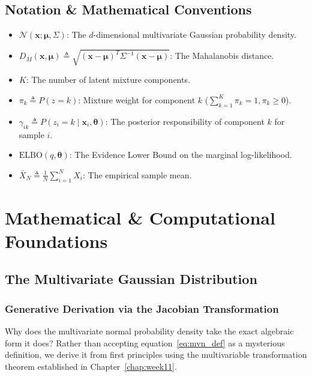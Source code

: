 \subsection{Notation \& Mathematical Conventions}
\begin{itemize}
    \item $\mathcal{N}(\mathbf{x}; \boldsymbol{\mu}, \Sigma)$: The $d$-dimensional multivariate Gaussian probability density.
    \item $D_M(\mathbf{x}, \boldsymbol{\mu}) \triangleq \sqrt{(\mathbf{x} - \boldsymbol{\mu})^T \Sigma^{-1} (\mathbf{x} - \boldsymbol{\mu})}$: The Mahalanobis distance.
    \item $K$: The number of latent mixture components.
    \item $\pi_k \triangleq P(z = k)$: Mixture weight for component $k$ ($\sum_{k=1}^K \pi_k = 1, \pi_k \ge 0$).
    \item $\gamma_{ik} \triangleq P(z_i = k \mid \mathbf{x}_i, \boldsymbol{\theta})$: The posterior responsibility of component $k$ for sample $i$.
    \item $\text{ELBO}(q, \boldsymbol{\theta})$: The Evidence Lower Bound on the marginal log-likelihood.
    \item $\bar{X}_N \triangleq \frac{1}{N}\sum_{i=1}^N X_i$: The empirical sample mean.
\end{itemize}

\section{Mathematical \& Computational Foundations}

\subsection{The Multivariate Gaussian Distribution}

\subsubsection{Generative Derivation via the Jacobian Transformation}
Why does the multivariate normal probability density take the exact algebraic form it does? Rather than accepting equation~\eqref{eq:mvn_def} as a mysterious definition, we derive it from first principles using the multivariable transformation theorem established in Chapter~\ref{chap:week11}.

